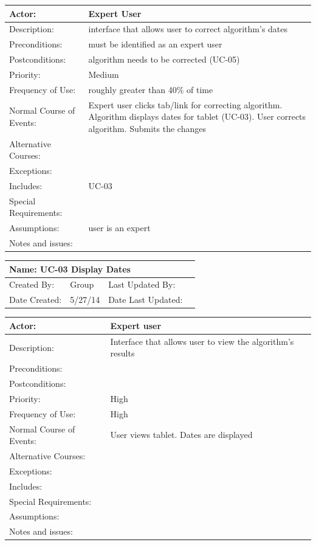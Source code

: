 \documentclass[11pt]{article}
\begin{document}
\begin{tabularx}{\textwidth}{|l|X|}
\hline
Actor: & Expert User\\\hline
Description: & interface that allows user to correct algorithm’s dates\\\hline
Preconditions: & must be identified as an expert user\\\hline
Postconditions: & algorithm needs to be corrected (UC-05)\\\hline
Priority: & Medium\\\hline
Frequency of Use: & roughly greater than 40\% of time\\\hline
Normal Course of Events: & Expert user clicks tab/link for correcting algorithm.
    Algorithm displays dates for tablet (UC-03).
    User corrects algorithm.
    Submits the changes
\\\hline
Alternative Courses: & \\\hline
Exceptions: & \\\hline
Includes: & UC-03\\\hline
Special Requirements: & \\\hline
Assumptions: & user is an expert\\\hline
Notes and issues: & \\\hline
\end{tabularx}
\newpage


\begin{tabularx}{\textwidth}{|l|X|X|X|}
\hline
\multicolumn{4}{|l|}{Name: UC-03    Display Dates}\\\hline
Created By: & Group & Last Updated By: &  \\\hline
Date Created: & 5/27/14 & Date Last Updated: &  \\\hline	
\end{tabularx}

\begin{tabularx}{\textwidth}{|l|X|}
\hline
Actor: & Expert user\\\hline
Description: & Interface that allows user to view the algorithm’s results\\\hline
Preconditions: & \\\hline
Postconditions: & \\\hline
Priority: & High\\\hline
Frequency of Use: & High\\\hline
Normal Course of Events: & User views tablet.
    Dates are displayed\\\hline
Alternative Courses: & \\\hline
Exceptions: & \\\hline
Includes: & \\\hline
Special Requirements: & \\\hline
Assumptions: & \\\hline
Notes and issues: & \\\hline
\end{tabularx}
\newpage
\end{document}
